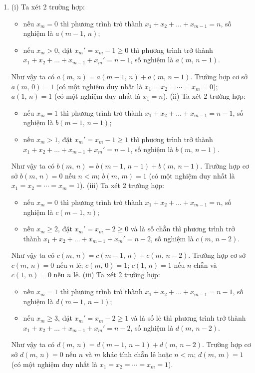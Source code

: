 \documentclass[a4paper, 11pt]{article}
\theoremstyle{definition}
\begin{document}
\begin{enumerate}[label=(\alph*)]
		(iv) Đặt $x_i = 2y_i+1$ với mọi $i\in [m]$. Khi đó bài toán quy về đếm số nghiệm nguyên không âm của phương trình $y_1 + y_2 +\ldots + y_m = \dfrac{n-m}{2}$. Như vậy, nếu $n-m$ lẻ thì phương trình vô nghiệm, còn nếu $n-m$ chẵn thì theo phiên bản \ref{euler_division_ver2}, số nghiệm sẽ bằng $\displaystyle {(n-m)/2 +m-1 \choose m-1}$.
		\item (i) Ta xét 2 trường hợp: \begin{itemize}
			\item nếu $x_m = 0$ thì phương trình trở thành $x_1 + x_2 + \ldots + x_{m-1} = n$, số nghiệm là $a(m-1,\,n)$;
			\item nếu $x_m > 0$, đặt $x_m' = x_m - 1 \ge 0$ thì phương trình trở thành $x_1 + x_2 + \ldots + x_{m-1} + x_m' = n-1$, số nghiệm là $a(m,\,n-1)$.
		\end{itemize}
		Như vậy ta có $a(m,\,n) = a(m-1,\,n) + a(m,\,n-1)$. Trường hợp cơ sở $a(m,\,0) = 1$ (có một nghiệm duy nhất là $x_1 = x_2 = \cdots = x_m = 0$); $a(1,\,n) = 1$ (có một nghiệm duy nhất là $x_1 = n$).
		(ii) Ta xét 2 trường hợp: \begin{itemize}
			\item nếu $x_m = 1$ thì phương trình trở thành $x_1 + x_2 + \ldots + x_{m-1} = n-1$, số nghiệm là $b(m-1,\,n-1)$;
			\item nếu $x_m > 1$, đặt $x_m' = x_m - 1 \ge 1$ thì phương trình trở thành $x_1 + x_2 + \ldots + x_{m-1} + x_m' = n-1$, số nghiệm là $b(m,\,n-1)$.
		\end{itemize}
		Như vậy ta có $b(m,\,n) = b(m-1,\,n-1) + b(m,\,n-1)$. Trường hợp cơ sở $b(m,\,n) = 0$ nếu $n < m$; $b(m,\,m) = 1$ (có một nghiệm duy nhất là $x_1 = x_2 = \cdots = x_m = 1$).
		(iii) Ta xét 2 trường hợp: \begin{itemize}
			\item nếu $x_m = 0$ thì phương trình trở thành $x_1 + x_2 + \ldots + x_{m-1} = n$, số nghiệm là $c(m-1,\,n)$;
			\item nếu $x_m \geq 2$, đặt $x_m' = x_m - 2 \ge 0$ và là số chẵn thì phương trình trở thành $x_1 + x_2 + \ldots + x_{m-1} + x_m' = n-2$, số nghiệm là $c(m,\,n-2)$.
		\end{itemize}
		Như vậy ta có $c(m,\,n) = c(m-1,\,n) + c(m,\,n-2)$. Trường hợp cơ sở $c(m,\,n) = 0$ nếu $n$ lẻ; $c(m,\,0) = 1$; $c(1,\,n) = 1$ nếu $n$ chẵn và $c(1,\,n) = 0$ nếu $n$ lẻ.
		(iii) Ta xét 2 trường hợp: \begin{itemize}
			\item nếu $x_m = 1$ thì phương trình trở thành $x_1 + x_2 + \ldots + x_{m-1} = n-1$, số nghiệm là $d(m-1,\,n-1)$;
			\item nếu $x_m \geq 3$, đặt $x_m' = x_m - 2 \ge 1$ và là số lẻ thì phương trình trở thành $x_1 + x_2 + \ldots + x_{m-1} + x_m' = n-2$, số nghiệm là $d(m,\,n-2)$.
		\end{itemize}
		Như vậy ta có $d(m,\,n) = d(m-1,\,n-1) + d(m,\,n-2)$. Trường hợp cơ sở $d(m,\,n) = 0$ nếu $n$ và $m$ khác tính chẵn lẻ hoặc $n < m$; $d(m,\,m) = 1$ (có một nghiệm duy nhất là $x_1 = x_2 = \cdots = x_m = 1$).
	\end{enumerate}
\end{document}
